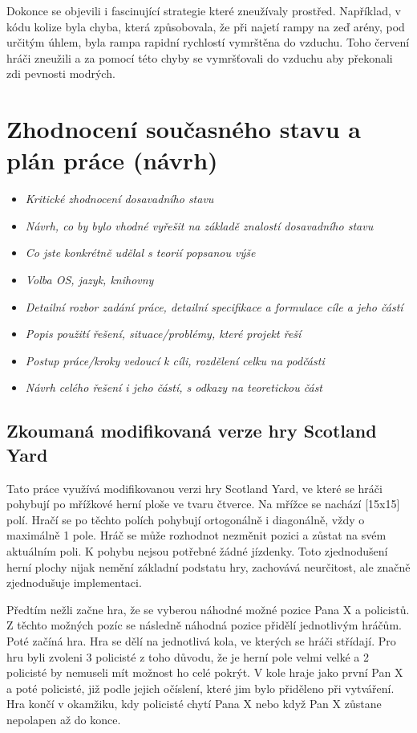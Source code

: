Dokonce se objevili i fascinující strategie které zneužívaly prostřed.
Například, v kódu kolize byla chyba, která způsobovala, že při najetí rampy na zeď arény, pod určitým úhlem, byla rampa rapidní rychlostí vymrštěna do vzduchu.
Toho červení hráči zneužili a za pomocí této chyby se vymršťovali do vzduchu aby překonali zdi pevnosti modrých.

\chapter{Zhodnocení současného stavu a plán práce (návrh)}
\label{ch:navrh}
\begin{itemize}
  \item \emph {Kritické zhodnocení dosavadního stavu}
  \item \emph {Návrh, co by bylo vhodné vyřešit na základě znalostí dosavadního stavu}
  \item \emph {Co jste konkrétně udělal s teorií popsanou výše}
  \item \emph {Volba OS, jazyk, knihovny}
  \item \emph {Detailní rozbor zadání práce, detailní specifikace a formulace cíle a jeho částí}
  \item \emph {Popis použití řešení, situace/problémy, které projekt řeší}
  \item \emph {Postup práce/kroky vedoucí k cíli, rozdělení celku na podčásti}
  \item \emph {Návrh celého řešení i jeho částí, s odkazy na teoretickou část}
\end{itemize}

\section*{Zkoumaná modifikovaná verze hry Scotland Yard}

Tato práce využívá modifikovanou verzi hry Scotland Yard, ve které se hráči pohybují po mřížkové herní ploše ve tvaru čtverce.
Na mřížce se nachází {\color{red}[15x15]} polí.
Hračí se po těchto polích pohybují ortogonálně i diagonálně, vždy o maximálně 1 pole.
Hráč se může rozhodnot nezměnit pozici a zůstat na svém aktuálním poli.
K pohybu nejsou potřebné žádné jízdenky.
Toto zjednodušení herní plochy nijak nemění základní podstatu hry, zachovává neurčitost, ale značně zjednodušuje implementaci.

Předtím nežli začne hra, že se vyberou náhodné možné pozice Pana X a policistů.
Z těchto možných pozíc se následně náhodná pozice přidělí jednotlivým hráčům.
Poté začíná hra.
Hra se dělí na jednotlivá kola, ve kterých se hráči střídají.
Pro hru byli zvoleni 3 policisté z toho důvodu, že je herní pole velmi velké a 2 policisté by nemuseli mít možnost ho celé pokrýt.
V kole hraje jako první Pan X a poté policisté, již podle jejich očíslení, které jim bylo přiděleno při vytváření.
Hra končí v okamžiku, kdy policisté chytí Pana X nebo když Pan X zůstane nepolapen až do konce.

